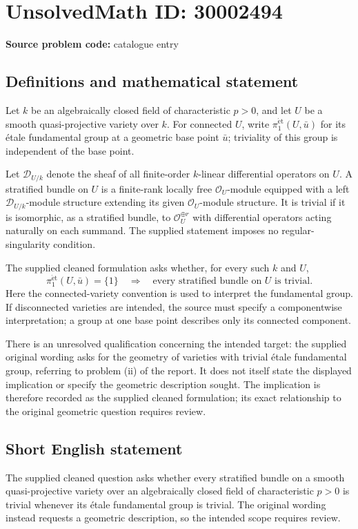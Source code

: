 \documentclass[11pt]{article}
\begin{document}
\section*{UnsolvedMath ID: 30002494}
\textbf{Source problem code:} catalogue entry
\subsection{Definitions and mathematical statement}
Let \(k\) be an algebraically closed field of characteristic \(p>0\), and let \(U\) be a smooth quasi-projective variety over \(k\). For connected \(U\), write \(\pi_1^{\mathrm{\acute et}}(U,\bar u)\) for its étale fundamental group at a geometric base point \(\bar u\); triviality of this group is independent of the base point.

Let \(\mathcal D_{U/k}\) denote the sheaf of all finite-order \(k\)-linear differential operators on \(U\). A stratified bundle on \(U\) is a finite-rank locally free \(\mathcal O_U\)-module equipped with a left \(\mathcal D_{U/k}\)-module structure extending its given \(\mathcal O_U\)-module structure. It is trivial if it is isomorphic, as a stratified bundle, to \(\mathcal O_U^{\oplus r}\) with differential operators acting naturally on each summand. The supplied statement imposes no regular-singularity condition.

The supplied cleaned formulation asks whether, for every such \(k\) and \(U\),
\[
\pi_1^{\mathrm{\acute et}}(U,\bar u)=\{1\}
\quad\Longrightarrow\quad
\text{every stratified bundle on }U\text{ is trivial}.
\]
Here the connected-variety convention is used to interpret the fundamental group. If disconnected varieties are intended, the source must specify a componentwise interpretation; a group at one base point describes only its connected component.

There is an unresolved qualification concerning the intended target: the supplied original wording asks for the geometry of varieties with trivial étale fundamental group, referring to problem (ii) of the report. It does not itself state the displayed implication or specify the geometric description sought. The implication is therefore recorded as the supplied cleaned formulation; its exact relationship to the original geometric question requires review.
\subsection{Short English statement}
The supplied cleaned question asks whether every stratified bundle on a smooth quasi-projective variety over an algebraically closed field of characteristic \(p>0\) is trivial whenever its étale fundamental group is trivial. The original wording instead requests a geometric description, so the intended scope requires review.
\end{document}
